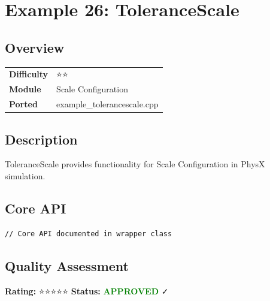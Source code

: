 \section{Example 26: ToleranceScale}
\subsection{Overview}
\begin{table}[h]
\centering
\begin{tabular}{|l|l|}
\hline
\textbf{Difficulty} & ⭐⭐ \\
\textbf{Module} & Scale Configuration \\
\textbf{Ported} & example\_tolerancescale.cpp \\
\hline
\end{tabular}
\end{table}

\subsection{Description}
ToleranceScale provides functionality for Scale Configuration in PhysX simulation.

\subsection{Core API}
\begin{lstlisting}
// Core API documented in wrapper class
\end{lstlisting}

\subsection{Quality Assessment}
\textbf{Rating:} ⭐⭐⭐⭐⭐ \quad \textbf{Status:} \textcolor{green}{\textbf{APPROVED}} ✓
